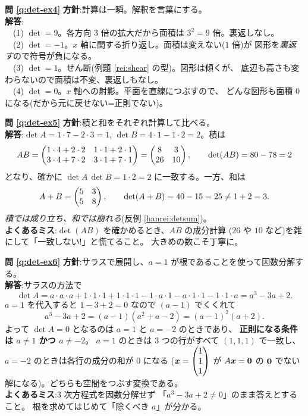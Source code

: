 \bigskip
\noindent\textbf{問 \ref{q:det-ex4}}\quad
\textbf{方針}:計算は一瞬。解釈を言葉にする。\\
\textbf{解答}:\\
　(1) $\det = 9$。各方向 $3$ 倍の拡大だから面積は $3^2 = 9$ 倍。裏返しなし。\\
　(2) $\det = -1$。$x$ 軸に関する折り返し。面積は変えない($1$ 倍)が
図形を\emph{裏返す}ので符号が負になる。\\
　(3) $\det = 1$。せん断(例題 \ref{rei:shear} の型)。図形は傾くが、
底辺も高さも変わらないので面積は不変、裏返しもなし。\\
　(4) $\det = 0$。$x$ 軸への射影。平面を直線につぶすので、
どんな図形も面積 $0$ になる(だから元に戻せない=正則でない)。

\bigskip
\noindent\textbf{問 \ref{q:det-ex5}}\quad
\textbf{方針}:積と和をそれぞれ計算して比べる。\\
\textbf{解答}:$\det A = 1 \cdot 7 - 2 \cdot 3 = 1$,
$\det B = 4 \cdot 1 - 1 \cdot 2 = 2$。積は
\[
AB = \begin{pmatrix}1 \cdot 4 + 2 \cdot 2 & 1 \cdot 1 + 2 \cdot 1 \\
3 \cdot 4 + 7 \cdot 2 & 3 \cdot 1 + 7 \cdot 1\end{pmatrix}
= \begin{pmatrix}8 & 3 \\ 26 & 10\end{pmatrix}, \qquad
\det(AB) = 80 - 78 = 2
\]
となり、確かに $\det A \, \det B = 1 \cdot 2 = 2$ に一致する。一方、和は
\[
A + B = \begin{pmatrix}5 & 3 \\ 5 & 8\end{pmatrix}, \qquad
\det(A + B) = 40 - 15 = 25 \neq 1 + 2 = 3.
\]
\emph{積では成り立ち、和では崩れる}(反例 \ref{hanrei:detsum})。\\
\textbf{よくあるミス}:$\det(AB)$ を確かめるとき、$AB$ の成分計算
($26$ や $10$ など)を雑にして「一致しない!」と慌てること。
大きめの数こそ丁寧に。

\bigskip
\noindent\textbf{問 \ref{q:det-ex6}}\quad
\textbf{方針}:サラスで展開し、$a = 1$ が根であることを使って因数分解する。\\
\textbf{解答}:サラスの方法で
\[
\det A = a \cdot a \cdot a + 1 \cdot 1 \cdot 1 + 1 \cdot 1 \cdot 1
- 1 \cdot a \cdot 1 - a \cdot 1 \cdot 1 - 1 \cdot 1 \cdot a
= a^3 - 3a + 2.
\]
$a = 1$ を代入すると $1 - 3 + 2 = 0$ なので $(a - 1)$ でくくれて
\[
a^3 - 3a + 2 = (a - 1)(a^2 + a - 2) = (a - 1)^2 (a + 2).
\]
よって $\det A = 0$ となるのは $a = 1$ と $a = -2$ のときであり、
\textbf{正則になる条件は $a \neq 1$ かつ $a \neq -2$}。
$a = 1$ のときは $3$ つの行がすべて $(1, 1, 1)$ で一致し、
$a = -2$ のときは各行の成分の和が $0$ になる
($\bm{x} = \begin{pmatrix}1 \\ 1 \\ 1\end{pmatrix}$ が $A\bm{x} = \bm{0}$ の
$\bm{0}$ でない解になる)。どちらも空間をつぶす変換である。\\
\textbf{よくあるミス}:$3$ 次方程式を因数分解せず
「$a^3 - 3a + 2 \neq 0$」のまま答えとすること。
根を求めてはじめて「除くべき $a$」が分かる。

